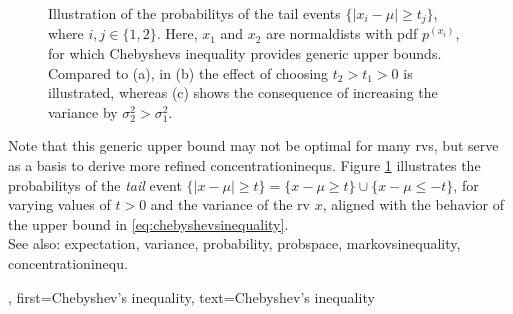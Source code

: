 {{\begin{figure}[ht]
        \caption{Illustration of the \glspl{probability} of the tail \glspl{event} $\{|x_i-\mu| \geq t_j\}$, where $i,j \in \{1,2\}$. Here, $x_1$ and $x_2$ are \glspl{normaldist} with \gls{pdf} $p^{(x_i)}$, for which Chebyshevs inequality provides generic upper bounds. Compared to (a), in (b) the effect of choosing $t_2 > t_1 > 0$ is illustrated, whereas (c) shows the consequence of increasing the \gls{variance} by $\sigma_2^2 > \sigma_1^2$.}
            \label{fig:chebyshevsinequality}
        \end{figure}
    Note that this generic upper bound may not be optimal for many \glspl{rv}, but serve as a basis to derive more refined          \glspl{concentrationinequ}. Figure \ref{fig:chebyshevsinequality} illustrates the \glspl{probability} of the  \textit{tail} \gls{event} 
    $\{|x - \mu | \geq t \} = \{x - \mu \geq t \} \cup \{x - \mu  \leq -t \}$, for varying values of $t>0$ and the \gls{variance}
    of the \gls{rv} $x$, aligned with the behavior of the upper bound in \eqref{eq:chebyshevsinequality}. \\
    See also: \gls{expectation}, \gls{variance}, \gls{probability},  \gls{probspace}, \gls{markovsinequality}, \gls{concentrationinequ}.},
    first={Chebyshev's inequality},
    text={Chebyshev's inequality}  
}



